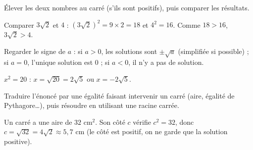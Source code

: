 Élever les deux nombres au carré (s'ils sont positifs), puis comparer les résultats.
\begin{exemple}
Comparer $3\sqrt2$ et $4$ : $(3\sqrt2)^{2}=9\times2=18$ et $4^{2}=16$. Comme $18>16$,
$3\sqrt2>4$.
\end{exemple}

Regarder le signe de $a$ : si $a>0$, les solutions sont $\pm\sqrt a$ (simplifiée si
possible) ; si $a=0$, l'unique solution est $0$ ; si $a<0$, il n'y a pas de solution.
\begin{exemple}
$x^{2}=20$ : $x=\sqrt{20}=2\sqrt5$ ou $x=-2\sqrt5$.
\end{exemple}

Traduire l'énoncé par une égalité faisant intervenir un carré (aire, égalité de Pythagore\ldots),
puis résoudre en utilisant une racine carrée.
\begin{exemple}
Un carré a une aire de $32\text{ cm}^{2}$. Son côté $c$ vérifie $c^{2}=32$, donc
$c=\sqrt{32}=4\sqrt2\approx5{,}7$ cm (le côté est positif, on ne garde que la solution
positive).
\end{exemple}

